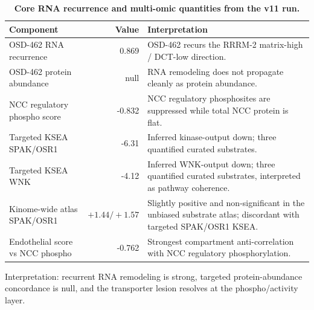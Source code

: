 \documentclass[10pt]{article}
\begin{document}
\begin{table}[H]
\centering\small
\caption{\textbf{Core RNA recurrence and multi-omic quantities from the v11 run.}}
\label{tab:h1}
\begin{tabularx}{\textwidth}{p{}rX}
\toprule
Component & Value & Interpretation \\
\midrule
OSD-462 RNA recurrence & 0.869 & OSD-462 recurs the RRRM-2 matrix-high / DCT-low direction. \\
OSD-462 protein abundance & null & RNA remodeling does not propagate cleanly as protein abundance. \\
NCC regulatory phospho score & -0.832 & NCC regulatory phosphosites are suppressed while total NCC protein is flat. \\
Targeted KSEA SPAK/OSR1 & -6.31 & Inferred kinase-output down; three quantified curated substrates. \\
Targeted KSEA WNK & -4.12 & Inferred WNK-output down; three quantified curated substrates, interpreted as pathway coherence. \\
Kinome-wide atlas SPAK/OSR1 & $+1.44/+1.57$ & Slightly positive and non-significant in the unbiased substrate atlas; discordant with targeted SPAK/OSR1 KSEA. \\
Endothelial score vs NCC phospho & -0.762 & Strongest compartment anti-correlation with NCC regulatory phosphorylation. \\
\bottomrule
\end{tabularx}
\end{table}

\noindent
Interpretation: recurrent RNA remodeling is strong, targeted protein-abundance concordance is null, and the transporter lesion resolves at the phospho/activity layer.
\end{document}
